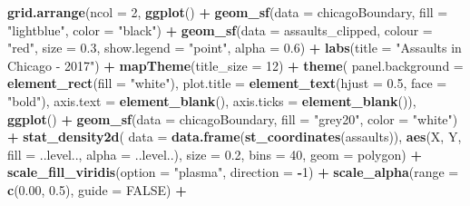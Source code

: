 \documentclass[
]{article}
\newenvironment{Shaded}{\begin{snugshade}}{\end{snugshade}}
\newcommand{\AttributeTok}[1]{\textcolor[rgb]{0.13,0.29,0.53}{#1}}
\newcommand{\ConstantTok}[1]{\textcolor[rgb]{0.56,0.35,0.01}{#1}}
\newcommand{\DecValTok}[1]{\textcolor[rgb]{0.00,0.00,0.81}{#1}}
\newcommand{\FloatTok}[1]{\textcolor[rgb]{0.00,0.00,0.81}{#1}}
\newcommand{\FunctionTok}[1]{\textcolor[rgb]{0.13,0.29,0.53}{\textbf{#1}}}
\newcommand{\NormalTok}[1]{#1}
\newcommand{\SpecialCharTok}[1]{\textcolor[rgb]{0.81,0.36,0.00}{\textbf{#1}}}
\newcommand{\StringTok}[1]{\textcolor[rgb]{0.31,0.60,0.02}{#1}}
\begin{document}
\begin{Shaded}
\begin{Highlighting}[]
\FunctionTok{grid.arrange}\NormalTok{(}\AttributeTok{ncol =} \DecValTok{2}\NormalTok{,}
  \FunctionTok{ggplot}\NormalTok{() }\SpecialCharTok{+} 
    \FunctionTok{geom\_sf}\NormalTok{(}\AttributeTok{data =}\NormalTok{ chicagoBoundary, }\AttributeTok{fill =} \StringTok{"lightblue"}\NormalTok{, }\AttributeTok{color =} \StringTok{"black"}\NormalTok{) }\SpecialCharTok{+} 
    \FunctionTok{geom\_sf}\NormalTok{(}\AttributeTok{data =}\NormalTok{ assaults\_clipped, }\AttributeTok{colour =} \StringTok{"red"}\NormalTok{, }\AttributeTok{size =} \FloatTok{0.3}\NormalTok{, }\AttributeTok{show.legend =} \StringTok{"point"}\NormalTok{, }\AttributeTok{alpha =} \FloatTok{0.6}\NormalTok{) }\SpecialCharTok{+} 
    \FunctionTok{labs}\NormalTok{(}\AttributeTok{title =} \StringTok{"Assaults in Chicago {-} 2017"}\NormalTok{) }\SpecialCharTok{+}
    \FunctionTok{mapTheme}\NormalTok{(}\AttributeTok{title\_size =} \DecValTok{12}\NormalTok{) }\SpecialCharTok{+}
    \FunctionTok{theme}\NormalTok{(}
      \AttributeTok{panel.background =} \FunctionTok{element\_rect}\NormalTok{(}\AttributeTok{fill =} \StringTok{"white"}\NormalTok{),}
      \AttributeTok{plot.title =} \FunctionTok{element\_text}\NormalTok{(}\AttributeTok{hjust =} \FloatTok{0.5}\NormalTok{, }\AttributeTok{face =} \StringTok{"bold"}\NormalTok{),}
      \AttributeTok{axis.text =} \FunctionTok{element\_blank}\NormalTok{(),}
      \AttributeTok{axis.ticks =} \FunctionTok{element\_blank}\NormalTok{()),}
  \FunctionTok{ggplot}\NormalTok{() }\SpecialCharTok{+} 
    \FunctionTok{geom\_sf}\NormalTok{(}\AttributeTok{data =}\NormalTok{ chicagoBoundary, }\AttributeTok{fill =} \StringTok{"grey20"}\NormalTok{, }\AttributeTok{color =} \StringTok{"white"}\NormalTok{) }\SpecialCharTok{+} 
    \FunctionTok{stat\_density2d}\NormalTok{(}
      \AttributeTok{data =} \FunctionTok{data.frame}\NormalTok{(}\FunctionTok{st\_coordinates}\NormalTok{(assaults)), }
      \FunctionTok{aes}\NormalTok{(X, Y, }\AttributeTok{fill =}\NormalTok{ ..level.., }\AttributeTok{alpha =}\NormalTok{ ..level..), }
      \AttributeTok{size =} \FloatTok{0.2}\NormalTok{, }\AttributeTok{bins =} \DecValTok{40}\NormalTok{, }\AttributeTok{geom =} \StringTok{\textquotesingle{}polygon\textquotesingle{}}\NormalTok{) }\SpecialCharTok{+} 
    \FunctionTok{scale\_fill\_viridis}\NormalTok{(}\AttributeTok{option =} \StringTok{"plasma"}\NormalTok{, }\AttributeTok{direction =} \SpecialCharTok{{-}}\DecValTok{1}\NormalTok{) }\SpecialCharTok{+} 
    \FunctionTok{scale\_alpha}\NormalTok{(}\AttributeTok{range =} \FunctionTok{c}\NormalTok{(}\FloatTok{0.00}\NormalTok{, }\FloatTok{0.5}\NormalTok{), }\AttributeTok{guide =} \ConstantTok{FALSE}\NormalTok{) }\SpecialCharTok{+} 

\end{Highlighting}
\end{Shaded}
\end{document}
